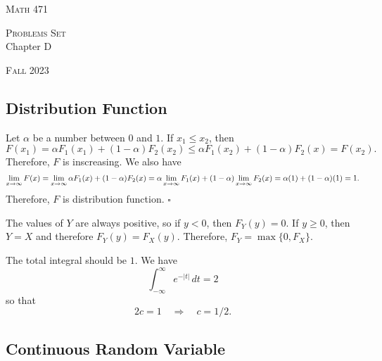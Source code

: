 


\hrulefill

\begin{minipage}{0.33\textwidth}
\textsc{Math 471}
\end{minipage} \hfill 
\begin{minipage}{0.32\textwidth}
\centering
\textsc{Problems Set} \\
Chapter D
\end{minipage}
 \hfill 
 \begin{minipage}{0.33\textwidth}
 \flushright \textsc{Fall 2023}
 \end{minipage}

\hrulefill

\setcounter{section}{4}

\subsection{Distribution Function}

\begin{problem}

Let $\alpha$ be a number between $0$ and $1$. If $x_1 \leq x_2$, then
    \[
        F(x_1) = \alpha F_1(x_1) + (1 - \alpha ) F_2 (x_2) \leq \alpha F_1 (x_2) + (1 - \alpha ) F_2 (x) = F (x_2) .
    \]
Therefore, $F$ is inscreasing. We also have
    \[
        \lim_{x \rightarrow \infty} F(x) = \lim_{x \rightarrow \infty} \alpha F_1 (x) + (1 - \alpha ) F_2 (x) = \alpha \lim_{x \rightarrow \infty} F_1 (x) + (1 - \alpha ) \lim_{x \rightarrow \infty} F_2 (x) = \alpha (1) + (1 - \alpha ) (1) = 1 .
    \]
Therefore, $F$ is distribution function. \hfill $\square$
\end{problem}

\begin{problem}
The values of $Y$ are always positive, so if $y < 0$, then $F_Y(y) = 0$. If $y \geq 0$, then $Y = X$ and therefore $F_Y (y) = F_X (y)$. Therefore, $F_Y = \max \{ 0 , F_X \}$. 
\end{problem}

\begin{problem}
The total integral should be $1$. We have
    \[
        \int_{-\infty}^\infty e^{-|t|} \, dt = 2
    \]
so that
    \[
        2c = 1 \quad \Rightarrow \quad c = 1/2 . \tag*{$\square$}
    \]
\end{problem}

\subsection{Continuous Random Variable}

